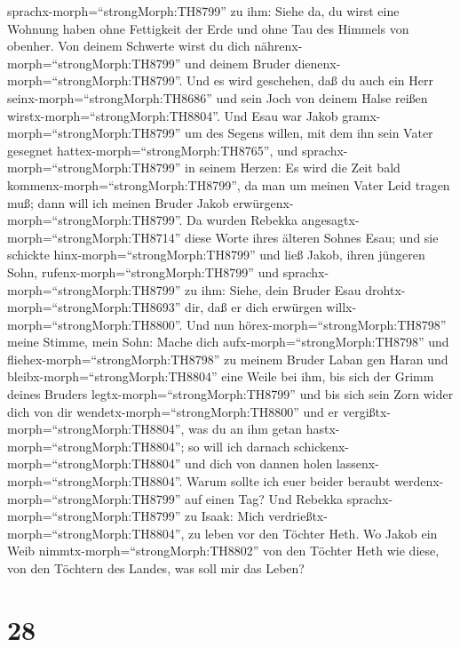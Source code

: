 sprachx-morph=``strongMorph:TH8799'' zu ihm: Siehe da, du wirst eine
Wohnung haben ohne Fettigkeit der Erde und ohne Tau des Himmels von
obenher.  Von deinem Schwerte wirst du dich
nährenx-morph=``strongMorph:TH8799'' und deinem Bruder
dienenx-morph=``strongMorph:TH8799''. Und es wird geschehen, daß du auch
ein Herr seinx-morph=``strongMorph:TH8686'' und sein Joch von deinem
Halse reißen wirstx-morph=``strongMorph:TH8804''.  Und Esau
war Jakob gramx-morph=``strongMorph:TH8799'' um des Segens willen, mit
dem ihn sein Vater gesegnet hattex-morph=``strongMorph:TH8765'', und
sprachx-morph=``strongMorph:TH8799'' in seinem Herzen: Es wird die Zeit
bald kommenx-morph=``strongMorph:TH8799'', da man um meinen Vater Leid
tragen muß; dann will ich meinen Bruder Jakob
erwürgenx-morph=``strongMorph:TH8799''.  Da wurden Rebekka
angesagtx-morph=``strongMorph:TH8714'' diese Worte ihres älteren Sohnes
Esau; und sie schickte hinx-morph=``strongMorph:TH8799'' und ließ Jakob,
ihren jüngeren Sohn, rufenx-morph=``strongMorph:TH8799'' und
sprachx-morph=``strongMorph:TH8799'' zu ihm: Siehe, dein Bruder Esau
drohtx-morph=``strongMorph:TH8693'' dir, daß er dich erwürgen
willx-morph=``strongMorph:TH8800''.  Und nun
hörex-morph=``strongMorph:TH8798'' meine Stimme, mein Sohn: Mache dich
aufx-morph=``strongMorph:TH8798'' und
fliehex-morph=``strongMorph:TH8798'' zu meinem Bruder Laban gen Haran
 und bleibx-morph=``strongMorph:TH8804'' eine Weile bei
ihm, bis sich der Grimm deines Bruders
legtx-morph=``strongMorph:TH8799''  und bis sich sein Zorn
wider dich von dir wendetx-morph=``strongMorph:TH8800'' und er
vergißtx-morph=``strongMorph:TH8804'', was du an ihm getan
hastx-morph=``strongMorph:TH8804''; so will ich darnach
schickenx-morph=``strongMorph:TH8804'' und dich von dannen holen
lassenx-morph=``strongMorph:TH8804''. Warum sollte ich euer beider
beraubt werdenx-morph=``strongMorph:TH8799'' auf einen Tag?
 Und Rebekka sprachx-morph=``strongMorph:TH8799'' zu Isaak:
Mich verdrießtx-morph=``strongMorph:TH8804'', zu leben vor den Töchter
Heth. Wo Jakob ein Weib nimmtx-morph=``strongMorph:TH8802'' von den
Töchter Heth wie diese, von den Töchtern des Landes, was soll mir das
Leben?

\hypertarget{section-27}{%
\section{28}\label{section-27}}

